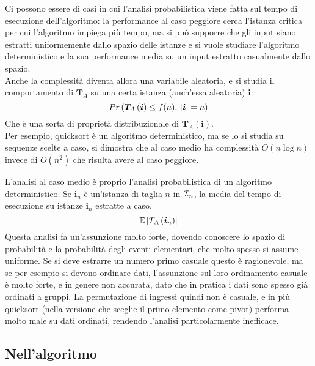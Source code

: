 Ci possono essere di casi in cui l'analisi probabilistica viene fatta sul tempo di esecuzione dell'algoritmo:
la performance al caso peggiore cerca l'istanza critica per cui l'algoritmo impiega più tempo, 
ma si può supporre che gli input siano estratti uniformemente dallo spazio delle istanze
e si vuole studiare l'algoritmo deterministico e la sua performance media su un input estratto casualmente dallo spazio.
\\
Anche la complessità diventa allora una variabile aleatoria, e si studia il comportamento di $
\bm{T}_A
$ su una certa istanza (anch'essa aleatoria) $
\bm{i}
$:
\begin{equation*}
    Pr \left( 
        \text{$
            \bm{T}_A \left( 
                \bm{i}
            \right)
            \leq f (n)
            , \,
            |
            \bm{i}
            | = n
        $}
    \right)
\end{equation*}
Che è una sorta di proprietà distribuzionale di $
\bm{T}_A \left( 
    \bm{i}
\right)
$.
\\
Per esempio, quicksort è un algoritmo deterministico, ma se lo si studia su sequenze scelte a caso, si dimostra che al caso medio ha complessità $
O \left( n \log n \right)
$ invece di $
O \left( n^2 \right)
$ che risulta avere al caso peggiore.

L'analisi al caso medio è proprio l'analisi probabilistica di un algoritmo deterministico.
Se $
\bm{i}_n
$ è un'istanza di taglia $n$ in $
\mathcal{I}{}_n
$, la media del tempo di esecuzione su istanze $
\bm{i}_n
$ estratte a caso.
\begin{equation*}
    \mathbb{E}\left[
        T_A \left( 
            \bm{i}_n
        \right)
    \right]
\end{equation*}
Questa analisi fa un'assunzione molto forte, dovendo conoscere lo spazio di probabilità e la probabilità degli eventi elementari, che molto spesso si assume uniforme.
Se si deve estrarre un numero primo casuale questo è ragionevole, ma se per esempio si devono ordinare dati, l'assunzione sul loro ordinamento casuale è molto forte, e in genere non accurata, dato che in pratica i dati sono spesso già ordinati a gruppi.
La permutazione di ingressi quindi non è casuale, e in più quicksort (nella versione che sceglie il primo elemento come pivot) performa molto male su dati ordinati, rendendo l'analisi particolarmente inefficace.

\subsection{Nell'algoritmo}

